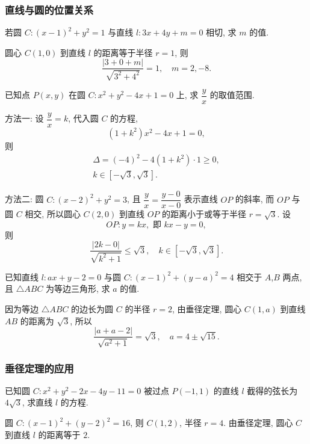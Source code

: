 \subsubsection{直线与圆的位置关系}
\begin{example}
    若圆 $C\colon (x-1)^2 +y^2 =1$ 与直线 $l\colon 3x+4y+m=0$ 相切, 求 $m$ 的值.
\end{example}
\beginsolution
    圆心 $C(1,0)$ 到直线 $l$ 的距离等于半径 $r=1$, 则
    \[\frac{|3+0+m|}{\sqrt{3^2+4^2}}=1,\quad
    m=2,-8.\]
\endsolution

\begin{example}
    已知点 $P(x,y)$ 在圆 $C\colon x^2 +y^2 -4x+1=0$ 上, 求 $\dfrac{y}x$ 的取值范围.
\end{example}
\beginsolution
    方法一: 设 $\dfrac{y}x= k$, 代入圆 $C$ 的方程,
    \[(1+k^2)x^2- 4x+ 1= 0,\]
    则
    \[\begin{gathered}
        \Delta= (-4)^2- 4(1+k^2)\cdot 1\geqslant 0,\\
        k\in [-\sqrt3,\sqrt3].
    \end{gathered}\]

    方法二: 圆 $C\colon (x-2)^2+y^2= 3$, 
    且 $\dfrac{y}x= \dfrac{y-0}{x-0}$ 表示直线 $OP$ 的斜率, 而 $OP$ 与圆 $C$ 相交, 所以圆心 $C(2,0)$ 到直线 $OP$ 的距离小于或等于半径 $r=\sqrt3$. 设 
    \[OP\colon y=kx, \text{\ 即\ } kx-y=0,\]
    则
    \[\frac{|2k-0|}{\sqrt{k^2+1}}\leqslant \sqrt3,\quad
    k\in [-\sqrt3,\sqrt3].\]
\endsolution

\lianxi
\begin{exercise}[s]
    已知直线 $l\colon ax+y-2=0$ 与圆 $C\colon (x-1)^2 +(y-a)^2 =4$ 相交于 $A$,$B$ 两点, 且 $\triangle ABC$ 为等边三角形, 求 $a$ 的值.
\end{exercise}
\beginsolution
    因为等边 $\triangle ABC$ 的边长为圆 $C$ 的半径 $r=2$, 由垂径定理, 圆心 $C(1,a)$ 到直线 $AB$ 的距离为 $\sqrt3$, 所以
    \[\frac{|a+a-2|}{\sqrt{a^2+1}}= \sqrt3,\quad
    a= 4\pm\sqrt{15}.\]
\endsolution

\subsubsection{垂径定理的应用}
\begin{example}
    已知圆 $C\colon x^2+y^2 -2x-4y-11=0$ 被过点 $P(-1,1)$ 的直线 $l$ 截得的弦长为 $4\sqrt3$, 求直线 $l$ 的方程.
\end{example}
\beginsolution
    圆 $C\colon (x-1)^2+ (y-2)^2= 16$, 则 $C(1,2)$, 半径 $r=4$. 由垂径定理, 圆心 $C$ 到直线 $l$ 的距离等于 $2$.

